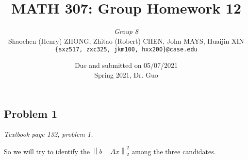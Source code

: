 \documentclass[11pt]{article}
\newcommand{\ilc}{\texttt}
\providecommand{\norm}[1]{\left\lVert #1 \right\rVert}
\begin{document}
\title{\textbf{MATH 307: Group Homework 12}}


\author{\textit{Group 8}\\
Shaochen (Henry) ZHONG, Zhitao (Robert) CHEN, John MAYS, Huaijin XIN\\ \ilc{\{sxz517, zxc325, jkm100, hxx200\}@case.edu}}

\date{Due and submitted on 05/07/2021 \\ Spring 2021, Dr. Guo}
\maketitle



\subsection*{Problem 1}
\textit{Textbook page 132, problem 1.}\newline

So we will try to identify the $\norm{b - Ax}_2^2$ among the three candidates.
\end{document}
